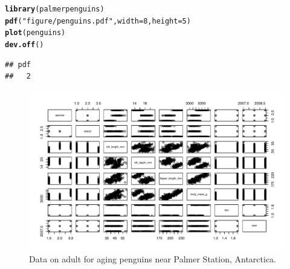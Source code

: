\documentclass{article}\usepackage[]{graphicx}\usepackage[]{xcolor}
\makeatletter
\newcommand{\hlnum}[1]{\textcolor[rgb]{0.686,0.059,0.569}{#1}}%
\newcommand{\hlsng}[1]{\textcolor[rgb]{0.192,0.494,0.8}{#1}}%
\newcommand{\hldef}[1]{\textcolor[rgb]{0.345,0.345,0.345}{#1}}%
\newcommand{\hlkwc}[1]{\textcolor[rgb]{0.333,0.667,0.333}{#1}}%
\newcommand{\hlkwd}[1]{\textcolor[rgb]{0.737,0.353,0.396}{\textbf{#1}}}%
\newenvironment{kframe}{%
 \def\at@end@of@kframe{}%
 \ifinner\ifhmode%
  \def\at@end@of@kframe{\end{minipage}}%
  \begin{minipage}{\columnwidth}%
 \fi\fi%
 \def\FrameCommand##1{\hskip\@totalleftmargin \hskip-\fboxsep
 \colorbox{shadecolor}{##1}\hskip-\fboxsep
     \hskip-\linewidth \hskip-\@totalleftmargin \hskip\columnwidth}%
 \MakeFramed {\advance\hsize-\width
   \@totalleftmargin\z@ \linewidth\hsize
   \@setminipage}}%
 {\par\unskip\endMakeFramed%
 \at@end@of@kframe}
\newenvironment{knitrout}{}{} %
\makeatother
\begin{document}
\begin{knitrout}
\color{fgcolor}\begin{kframe}
\begin{alltt}
\hlkwd{library}\hldef{(palmerpenguins)}
\hlkwd{pdf}\hldef{(}\hlsng{"figure/penguins.pdf"}\hldef{,}\hlkwc{width}\hldef{=} \hlnum{8}\hldef{,} \hlkwc{height}\hldef{=}\hlnum{5}\hldef{)}
\hlkwd{plot}\hldef{(penguins)}
\hlkwd{dev.off}\hldef{()}
\end{alltt}
\begin{verbatim}
## pdf 
##   2
\end{verbatim}
\end{kframe}
\end{knitrout}
\begin{figure}[H]
\begin{center}
\includegraphics[scale=0.8]{figure/penguins.pdf}
\caption{Data on adult for aging penguins near Palmer Station, Antarctica.}
\label{plot3}
\end{center}
\end{figure} 
 
\end{document}
